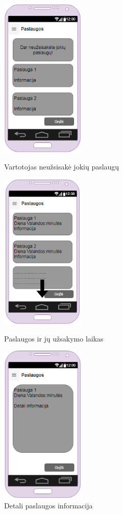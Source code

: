\documentclass[oneside]{VUMIFPSkursinis}
\begin{document}
\begin{figure}[h]
\centering
\parbox{5cm}{
\includegraphics[width=4cm]{GUI-17-uzsakytos-paslaugos(1).png}
\caption{Vartotojas neužsisakė jokių paslaugų}
\label{fig:2figsA}}
\qquad
\begin{minipage}{5cm}
\includegraphics[width=4cm]{GUI-17-uzsakytos-paslaugos(2).png}
\caption{Paslaugos ir jų užsakymo laikas}
\label{fig:2figsB}
\end{minipage}
\begin{minipage}{5cm}
\includegraphics[width=4cm]{GUI-17-uzsakytos-paslaugos(3).png}
\caption{Detali paslaugos informacija}
\label{fig:2figsC}
\end{minipage}
\end{figure}
\end{document}
